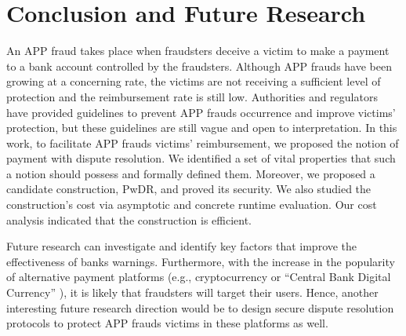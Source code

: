 
 \vspace{-2.8mm}
\section{Conclusion and Future Research}\label{sec::conclusion}


An APP fraud takes place when fraudsters deceive a victim to make a payment to a bank account controlled by the fraudsters. Although APP frauds have been growing at a concerning rate, the  victims are not receiving a sufficient level of protection and the reimbursement rate is still low. Authorities and regulators have  provided guidelines  to prevent APP frauds occurrence and improve victims’ protection, but these guidelines are still vague and open to interpretation. In this work, to facilitate APP frauds victims’ reimbursement,  we proposed the notion of payment with dispute resolution. We identified a set of vital properties that such a notion  should possess and formally defined them. Moreover,  we proposed a candidate construction, PwDR, and proved its security.  We also  studied the construction's cost via asymptotic and concrete runtime evaluation. Our cost analysis indicated that the construction is efficient. 



Future research can investigate and identify key factors that  improve the effectiveness of banks warnings.  Furthermore, with the increase in the popularity of  alternative payment platforms (e.g.,  cryptocurrency or ``Central Bank Digital Currency'' \cite{CBDC}), it is likely that  fraudsters will target their users. Hence, another interesting future research direction would be to design secure dispute resolution protocols  to protect  APP frauds victims in these platforms as well. 



